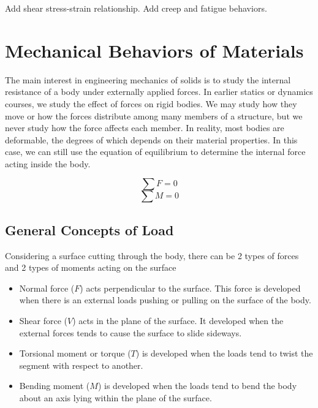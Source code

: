 \documentclass[
fontsize=10pt,
a4paper,
twosides=false,
open=any,
svgnames,
]{kaobook} %
\begin{document}
Add shear stress-strain relationship. Add creep and fatigue behaviors.

\tableofcontents

\listoffigures

\listoftables

\mainmatter


\chapter{Mechanical Behaviors of Materials}
\label{chap: basic mechanics of materials}

The main interest in engineering mechanics of solids is to study the internal resistance of a body under externally applied forces. In earlier statics or dynamics courses, we study the effect of forces on rigid bodies. We may study how they move or how the forces distribute among many members of a structure, but we never study how the force affects each member. In reality, most bodies are deformable, the degrees of which depends on their material properties. In this case, we can still use the equation of equilibrium to determine the internal force acting inside the body.

$$ \sum F = 0 $$
$$ \sum M = 0 $$

\section{General Concepts of Load}

Considering a surface cutting through the body, there can be 2 types of forces and 2 types of moments acting on the surface

\begin{itemize}
  \item Normal force ($F$) acts perpendicular to the surface. This force is developed when there is an external loads pushing or pulling on the surface of the body.
  \item Shear force ($V$) acts in the plane of the surface. It developed when the external forces tends to cause the surface to slide sideways.
  \item Torsional moment or torque ($T$) is developed when the loads tend to twist the segment with respect to another.
  \item Bending moment ($M$) is developed when the loads tend to bend the body about an axis lying within the plane of the surface.
\end{itemize}
\end{document}
